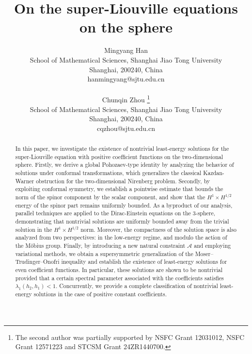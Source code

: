 \documentclass[a4paper, 12pt]{article}
\begin{document}
	\pagestyle{plain}
	
	\title{On the super-Liouville equations on the sphere}
	
	\author{\small{Mingyang Han}\\
		\small{School of Mathematical Sciences, Shanghai Jiao Tong University}\\
		\small{Shanghai, 200240, China}\\
		\small{hanmingyang@sjtu.edu.cn}\\\\
		\small{Chunqin Zhou}
		\footnote{The second author was partially supported by NSFC Grant 12031012, NSFC Grant 12571223 and  STCSM Grant 24ZR1440700.}
		\\
		\small{School of Mathematical Sciences, Shanghai Jiao Tong University}\\
		\small{Shanghai, 200240, China}\\
		\small{cqzhou@sjtu.edu.cn}}
	
	
	\date{}
	\maketitle
	
	\begin{abstract}
		In this paper, we investigate the existence of nontrivial least-energy solutions for the super-Liouville equation with positive coefficient functions on the two-dimensional sphere. Firstly, we derive a global Pohozaev-type identity by analyzing the behavior of solutions under conformal transformations, which generalizes the classical Kazdan-Warner obstruction for the two-dimensional Nirenberg problem. Secondly, by exploiting conformal symmetry, we establish a pointwise estimate that bounds the norm of the spinor component by the scalar component, and show that the $H^1 \times H^{1/2}$ energy of the spinor part remains uniformly bounded. As a byproduct of our analysis, parallel techniques are applied to the Dirac-Einstein equations on the 3-sphere, demonstrating that nontrivial solutions are uniformly bounded away from the trivial solution in the $H^1 \times H^{1/2}$ norm. Moreover, the compactness of the solution space is also analyzed from two perspectives: in the low-energy regime, and modulo the action of the M\"obius group. Finally, by introducing a new natural constraint $\mathcal{A}$ and employing variational methods, we obtain a supersymmetric generalization of the Moser–Trudinger–Onofri inequality and  establish the existence of least-energy solutions for even coefficient functions. In particular, these solutions are shown to be nontrivial provided that a certain spectral parameter associated with the coefficients satisfies $\lambda_1(h_2, h_1) < 1$. Concurrently, we provide a complete classification of nontrivial least-energy solutions in the case of positive constant coefficients.
	\end{abstract}
	
\end{document}
